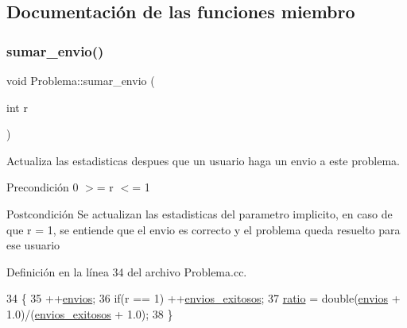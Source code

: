 \subsection{Documentación de las funciones miembro}
\mbox{\label{class_problema_a418b7c394398c77cd81e5b8a1c218ba2}} 
\subsubsection{\texorpdfstring{sumar\+\_\+envio()}{sumar\_envio()}}
{\footnotesize\ttfamily void Problema\+::sumar\+\_\+envio (\begin{DoxyParamCaption}\item[{int}]{r }\end{DoxyParamCaption})}



Actualiza las estadisticas despues que un usuario haga un envio a este problema. 

\begin{DoxyPrecond}{Precondición}
0 $>$= r $<$= 1 
\end{DoxyPrecond}
\begin{DoxyPostcond}{Postcondición}
Se actualizan las estadisticas del parametro implicito, en caso de que r = 1, se entiende que el envio es correcto y el problema queda resuelto para ese usuario 
\end{DoxyPostcond}


Definición en la línea 34 del archivo Problema.\+cc.


\begin{DoxyCode}
34                                 \{
35   ++\mbox{\hyperlink{class_problema_aaef8dcb723fa829a052517a00aed003e}{envios}};
36   \textcolor{keywordflow}{if}(r == 1) ++\mbox{\hyperlink{class_problema_ad8f0dfd65c2673395ad72ae9817cb7ae}{envios\_exitosos}};
37   \mbox{\hyperlink{class_problema_acc3d2ce24418ad68650108de4b603d99}{ratio}} = double(\mbox{\hyperlink{class_problema_aaef8dcb723fa829a052517a00aed003e}{envios}} + 1.0)/(\mbox{\hyperlink{class_problema_ad8f0dfd65c2673395ad72ae9817cb7ae}{envios\_exitosos}} + 1.0);
38 \}
\end{DoxyCode}
\mbox{\label{class_problema_a29c94c089b042f3a7cc1fda4739460bd}} 
